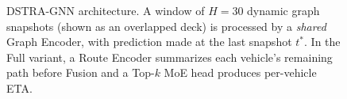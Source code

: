 \documentclass[pdflatex,sn-basic,Numbered]{sn-jnl}%
\begin{document}
\begin{figure}[t]
{
}
    \caption{DSTRA-GNN architecture. A window of $H{=}30$ dynamic graph snapshots (shown as an overlapped deck) is processed by a \emph{shared} Graph Encoder, with prediction made at the last snapshot $t^*$. In the Full variant, a Route Encoder summarizes each vehicle's remaining path before Fusion and a Top-$k$ MoE head produces per-vehicle ETA.}\label{fig:temporal-moe-eta}
\end{figure}
\end{document}
